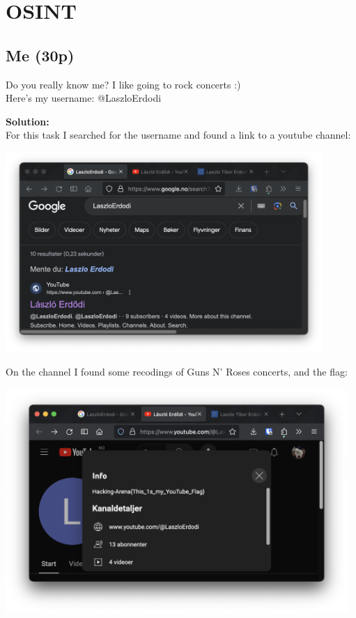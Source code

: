 \section{OSINT}

\subsection{Me (30p)}
\addtocounter{points}{30}
Do you really know me? I like going to rock concerts :) 
\\Here's my username: @LaszloErdodi

\textbf{Solution:}\\
For this task I searched for the username and found a link to a youtube channel:

\begin{center}
    \includegraphics[width=12cm]{img/OSINT/Me/Screenshot 2023-11-24 at 10.26.01.png}
\end{center}

On the channel I found some recodings of Guns N' Roses concerts, and the flag:

\begin{center}
    \includegraphics[width=13cm]{img/OSINT/Me/Screenshot 2023-11-24 at 10.26.06.png}
\end{center}

